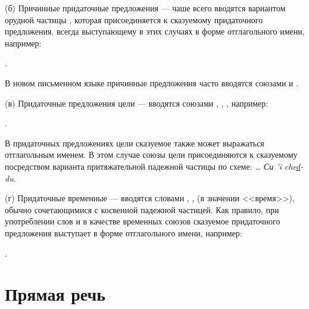 (б)	Причинные придаточные предложения --- чаше всего вводятся вариантом орудной частицы , которая присоединяется к сказуемому придаточного предложения, всегда выступающему в этих случаях в форме отглагольного имени, например:
\begin{prfsample}
	\item {}.
\end{prfsample}

В новом письменном языке причинные предложения часто вводятся союзами  и .

(в)	Придаточные предложения цели --- вводятся союзами , , , например:
\begin{prfsample}
	\item {}.
\end{prfsample}
В придаточных предложениях цели сказуемое также может выражаться отглагольным именем. В этом случае союзы цели присоединяются к сказуемому посредством варианта притяжательной падежной частицы  по схеме: \emph{\ldots{} Си 'i che\ul{d}-du}.

(г)	Придаточные временные --- вводятся словами
, ,  (в значении <<время>>), обычно сочетающимися с косвенной падежной частицей. Как правило, при употреблении слов  и  в качестве временных союзов сказуемое придаточного предложения выступает в форме отглагольного имени, например:
\begin{prfsample}
	\item {}.
\end{prfsample}

\section{Прямая речь}

